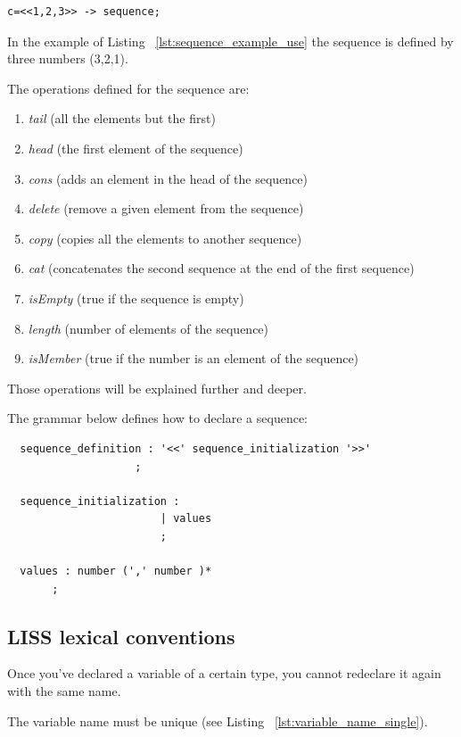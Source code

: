 \documentclass[
  oneside,
  11pt, a4paper,
  footinclude=true,
  headinclude=true,
  cleardoublepage=empty
]{scrbook}
\begin{document}
\begin{lstlisting}[caption={Example of valid operations using sequence on LISS},label={lst:sequence_example_use}]
  c=<<1,2,3>> -> sequence;
\end{lstlisting}

In the example of Listing ~\ref{lst:sequence_example_use} the sequence is defined by three numbers (3,2,1). 

The operations defined for the sequence are:
\begin{enumerate}
\item \textit{tail} (all the elements but the first)
\item \textit{head} (the first element of the sequence)
\item \textit{cons} (adds an element in the head of the sequence)
\item \textit{delete} (remove a given element from the sequence)
\item \textit{copy} (copies all the elements to another sequence)
\item \textit{cat} (concatenates the second sequence at the end of the first sequence)
\item \textit{isEmpty} (true if the sequence is empty)
\item \textit{length} (number of elements of the sequence)
\item \textit{isMember} (true if the number is an element of the sequence)
\end{enumerate}
Those operations will be explained further and deeper.

The grammar below defines how to declare a sequence:

\begin{lstlisting}
  sequence_definition : '<<' sequence_initialization '>>'
                    ;

  sequence_initialization :
                        | values
                        ;

  values : number (',' number )*
       ;

\end{lstlisting}

\subsection{LISS lexical conventions}

Once you've declared a variable of a certain type, you cannot redeclare it again with the same name.

The variable name must be unique (see Listing ~\ref{lst:variable_name_single}).
\end{document}
